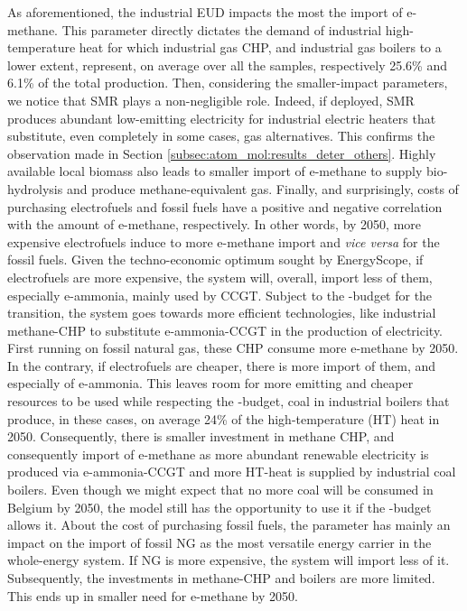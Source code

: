 As aforementioned, the industrial \gls{EUD} impacts the most the import of e-methane. This parameter directly dictates the demand of industrial high-temperature heat for which industrial gas \gls{CHP}, and industrial gas boilers to a lower extent, represent, on average over all the samples, respectively 25.6\% and 6.1\% of the total production. Then, considering the smaller-impact parameters, we notice that \gls{SMR} plays a non-negligible role. Indeed, if deployed, \gls{SMR} produces abundant low-emitting electricity for industrial electric heaters that substitute, even completely in some cases, gas alternatives. This confirms the observation made in Section \ref{subsec:atom_mol:results_deter_others}. Highly available local biomass also leads to smaller import of e-methane to supply bio-hydrolysis and produce methane-equivalent gas. Finally, and surprisingly, costs of purchasing electrofuels and fossil fuels have a positive and negative correlation with the amount of e-methane, respectively. In other words, by 2050, more expensive electrofuels induce to more e-methane import and \textit{vice versa} for the fossil fuels. Given the techno-economic optimum sought by EnergyScope, if electrofuels are more expensive, the system will, overall, import less of them, especially e-ammonia, mainly used by \gls{CCGT}. Subject to the -budget for the transition, the system goes towards more efficient technologies, like industrial methane-\gls{CHP} to substitute e-ammonia-\gls{CCGT} in the production of electricity. First running on fossil natural gas, these \gls{CHP} consume more e-methane by 2050. In the contrary, if electrofuels are cheaper, there is more import of them, and especially of e-ammonia. This leaves room for more emitting and cheaper resources to be used while respecting the -budget, \ie coal in industrial boilers that produce, in these cases, on average 24\% of the high-temperature (HT) heat in 2050. Consequently, there is smaller investment in methane \gls{CHP}, and consequently import of e-methane as more abundant renewable electricity is produced via e-ammonia-\gls{CCGT} and more HT-heat is supplied by industrial coal boilers. Even though we might expect that no more coal will be consumed in Belgium by 2050, the model still has the opportunity to use it if the -budget allows it. About the cost of purchasing fossil fuels, the parameter has mainly an impact on the import of fossil \gls{NG} as the most versatile energy carrier in the whole-energy system. If \gls{NG} is more expensive, the system will import less of it. Subsequently, the investments in methane-\gls{CHP} and boilers are more limited. This ends up in smaller need for e-methane by 2050.

